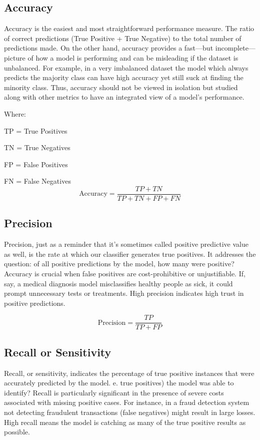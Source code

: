 \subsection{Accuracy}

Accuracy is the easiest and most straightforward performance measure. The ratio of correct predictions (True Positive + True Negative) to the total number of predictions made. On the other hand, accuracy provides a fast—but incomplete—picture of how a model is performing and can be misleading if the dataset is unbalanced. For example, in a very imbalanced dataset the model which always predicts the majority class can have high accuracy yet still suck at finding the minority class. Thus, accuracy should not be viewed in isolation but studied along with other metrics to have an integrated view of a model's performance.

Where:

TP = True Positives

TN = True Negatives

FP = False Positives

FN = False Negatives
 \begin{equation}
\text{Accuracy} = \frac{TP + TN}{TP + TN + FP + FN}
\end{equation}

 

\subsection{Precision}
Precision, just as a reminder that it’s sometimes called positive predictive value as well, is the rate at which our classifier generates true positives. It addresses the question: of all positive predictions by the model, how many were positive? Accuracy is crucial when false positives are cost-prohibitive or unjustifiable. If, say, a medical diagnosis model misclassifies healthy people as sick, it could prompt unnecessary tests or treatments. High precision indicates high trust in positive predictions.


\begin{equation}
\text{Precision} = \frac{TP}{TP + FP}
\end{equation}



\subsection{Recall or Sensitivity}

Recall, or sensitivity, indicates the percentage of true positive instances that were accurately predicted by the model. e. true positives) the model was able to identify? Recall is particularly significant in the presence of severe costs associated with missing positive cases. For instance, in a fraud detection system not detecting fraudulent transactions (false negatives) might result in large losses. High recall means the model is catching as many of the true positive results as possible.


